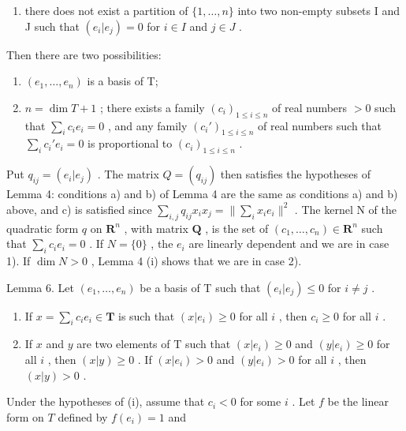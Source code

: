 \begin{enumerate}
\def\labelenumi{\alph{enumi})}
\setcounter{enumi}{1}
\tightlist
\item
  there does not exist a partition of \(\{1, \ldots, n\}\) into two non-empty subsets I and J such that \((e_i|e_j) = 0\) for \(i \in I\) and \(j \in J\) .
\end{enumerate}

Then there are two possibilities:

\begin{enumerate}
\def\labelenumi{\arabic{enumi})}
\item
  \((e_1, \ldots, e_n)\) is a basis of T;
\item
  \(n = \dim T + 1\) ; there exists a family \((c_i)_{1 \leqslant i \leqslant n}\) of real numbers \(> 0\) such that \(\sum_{i} c_i e_i = 0\) , and any family \((c_i')_{1 \leqslant i \leqslant n}\) of real numbers such that \(\sum_{i} c_i' e_i = 0\) is proportional to \((c_i)_{1 \leqslant i \leqslant n}\) .
\end{enumerate}

Put \(q_{ij} = (e_i|e_j)\) . The matrix \(Q = (q_{ij})\) then satisfies the hypotheses of Lemma 4: conditions a) and b) of Lemma 4 are the same as conditions a) and b) above, and c) is satisfied since \(\sum_{i,j} q_{ij} x_i x_j = \|\sum_{i} x_i e_i\|^2\) . The kernel N of the quadratic form \(q\) on \(\mathbf{R}^n\) , with matrix \(\mathbf{Q}\) , is the set of \((c_1, \ldots, c_n) \in \mathbf{R}^n\) such that \(\sum_{i} c_i e_i = 0\) . If \(N = \{0\}\) , the \(e_i\) are linearly dependent and we are in case 1). If \(\dim N > 0\) , Lemma 4 (i) shows that we are in case 2).

Lemma 6. Let \((e_1, \ldots, e_n)\) be a basis of T such that \((e_i | e_j) \leqslant 0\) for \(i \neq j\) .

\begin{enumerate}
\def\labelenumi{(\roman{enumi})}
\item
  If \(x = \sum_{i} c_i e_i \in \mathbf{T}\) is such that \((x|e_i) \geqslant 0\) for all \(i\) , then \(c_i \geqslant 0\) for all \(i\) .
\item
  If \(x\) and \(y\) are two elements of \(\mathrm{T}\) such that \((x|e_i) \geqslant 0\) and \((y|e_i) \geqslant 0\) for all \(i\) , then \((x|y) \geqslant 0\) . If \((x|e_i) > 0\) and \((y|e_i) > 0\) for all \(i\) , then \((x|y) > 0\) .
\end{enumerate}

Under the hypotheses of (i), assume that \(c_{i} < 0\) for some \(i\) . Let \(f\) be the linear form on \(T\) defined by \(f(e_{i}) = 1\) and

